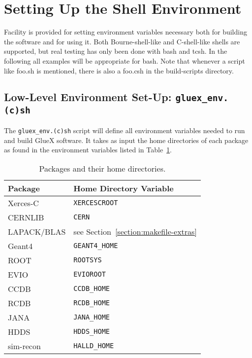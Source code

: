 \documentclass[12pt]{article}
\begin{document}
\section{Setting Up the Shell Environment}

Facility is provided for setting environment variables necessary both
for building the software and for using it. Both Bourne-shell-like and
C-shell-like shells are supported, but real testing has only been done
with bash and tcsh. In the following all examples will be appropriate
for bash. Note that whenever a script like foo.sh is mentioned, there
is also a foo.csh in the build-scripts directory.

\subsection{Low-Level Environment Set-Up: {\tt gluex\_env.(c)sh}}
\label{section:low-level-environment-setting}

The {\tt gluex\_env.(c)sh} script will define all environment
variables needed to run and build GlueX software. It takes as input
the home directories of each package as found in the environment
variables listed in Table~\ref{table:home-directories}.

\begin{table}
\begin{center}
\begin{tabular}{|l|l|}
\hline
\bf Package & \bf Home Directory Variable \\
\hline Xerces-C & {\tt XERCESCROOT} \\
CERNLIB & {\tt CERN} \\
LAPACK/BLAS & see Section~\ref{section:makefile-extras} \\
Geant4 & {\tt GEANT4\_HOME} \\
ROOT & {\tt ROOTSYS} \\
EVIO & {\tt EVIOROOT} \\
CCDB & {\tt CCDB\_HOME} \\
RCDB & {\tt RCDB\_HOME} \\
JANA & {\tt JANA\_HOME} \\
HDDS & {\tt HDDS\_HOME} \\
sim-recon & {\tt HALLD\_HOME} \\
\hline
\end{tabular}
\end{center}
\caption{Packages and their home directories.}\label{table:home-directories}
\end{table}
\end{document}
